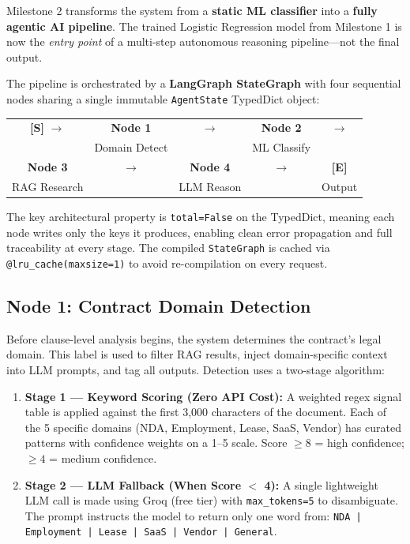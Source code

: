 \documentclass[12pt,a4paper]{article}
\begin{document}
Milestone 2 transforms the system from a \textbf{static ML classifier} into a
\textbf{fully agentic AI pipeline}. The trained Logistic Regression model from
Milestone 1 is now the \emph{entry point} of a multi-step autonomous reasoning
pipeline---not the final output.

The pipeline is orchestrated by a \textbf{LangGraph StateGraph} with four sequential
nodes sharing a single immutable \texttt{AgentState} TypedDict object:

\begin{center}
\begin{tabular}{@{}ccccc@{}}
\textbf{[S]} $\rightarrow$ &
\textbf{Node 1} & $\rightarrow$ & \textbf{Node 2} & $\rightarrow$ \\
& Domain Detect & & ML Classify & \\[4pt]
\textbf{Node 3} & $\rightarrow$ & \textbf{Node 4} & $\rightarrow$ & \textbf{[E]} \\
RAG Research & & LLM Reason & & Output \\
\end{tabular}
\end{center}

The key architectural property is \texttt{total=False} on the TypedDict, meaning
each node writes only the keys it produces, enabling clean error propagation and
full traceability at every stage. The compiled \texttt{StateGraph} is cached via
\texttt{@lru\_cache(maxsize=1)} to avoid re-compilation on every request.

\subsection{Node 1: Contract Domain Detection}

Before clause-level analysis begins, the system determines the contract's legal
domain. This label is used to filter RAG results, inject domain-specific context
into LLM prompts, and tag all outputs. Detection uses a two-stage algorithm:

\begin{enumerate}
    \item \textbf{Stage 1 --- Keyword Scoring (Zero API Cost):} A weighted regex
    signal table is applied against the first 3,000 characters of the document.
    Each of the 5 specific domains (NDA, Employment, Lease, SaaS, Vendor) has
    curated patterns with confidence weights on a 1--5 scale. Score $\geq 8$ = high
    confidence; $\geq 4$ = medium confidence.

    \item \textbf{Stage 2 --- LLM Fallback (When Score $<$ 4):} A single lightweight
    LLM call is made using Groq (free tier) with \texttt{max\_tokens=5} to
    disambiguate. The prompt instructs the model to return only one word from:
    \texttt{NDA | Employment | Lease | SaaS | Vendor | General}.
\end{enumerate}
\end{document}
